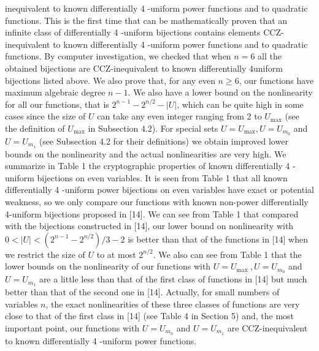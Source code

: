 \documentclass[10pt]{article}
\begin{document}
inequivalent to known differentially 4 -uniform power functions and to quadratic functions. This is the first time that can be mathematically proven that an infinite class of differentially 4 -uniform bijections contains elements CCZ-inequivalent to known differentially 4 -uniform power functions and to quadratic functions. By computer investigation, we checked that when $n=6$ all the obtained bijections are CCZ-inequivalent to known differentially 4uniform bijections listed above. We also prove that, for any even $n \geq 6$, our functions have maximum algebraic degree $n-1$. We also have a lower bound on the nonlinearity for all our functions, that is $2^{n-1}-2^{n / 2}-|U|$, which can be quite high in some cases since the size of $U$ can take any even integer ranging from 2 to $U_{\max }$ (see the definition of $U_{\max }$ in Subsection 4.2). For special sets $U=U_{\max }, U=U_{m_{0}}$ and $U=U_{m_{1}}$ (see Subsection 4.2 for their definitions) we obtain improved lower bounds on the nonlinearity and the actual nonlinearities are very high. We summarize in Table 1 the cryptographic properties of known differentially 4 -uniform bijections on even variables. It is seen from Table 1 that all known differentially 4 -uniform power bijections on even variables have exact or potential weakness, so we only compare our functions with known non-power differentially 4-uniform bijections proposed in [14]. We can see from Table 1 that compared with the bijections constructed in [14], our lower bound on nonlinearity with $0<|U|<\left(2^{n-1}-2^{n / 2}\right) / 3-2$ is better than that of the functions in [14] when we restrict the size of $U$ to at most $2^{n / 2}$. We also can see from Table 1 that the lower bounds on the nonlinearity of our functions with $U=U_{\text {max }}, U=U_{m_{0}}$ and $U=U_{m_{1}}$ are a little less than that of the first class of functions in [14] but much better than that of the second one in [14]. Actually, for small numbers of variables $n$, the exact nonlinearities of these three classes of functions are very close to that of the first class in [14] (see Table 4 in Section 5) and, the most important point, our functions with $U=U_{m_{0}}$ and $U=U_{m_{1}}$ are CCZ-inequivalent to known differentially 4 -uniform power functions.
\end{document}
